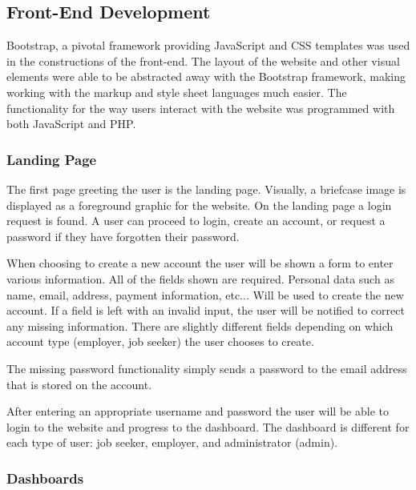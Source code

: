 \documentclass[11pt]{article}
\begin{document}
\subsection{Front-End Development}

Bootstrap, a pivotal framework providing JavaScript and CSS templates was used in the constructions of the front-end. The layout of the website and other visual elements were able to be abstracted away with the Bootstrap framework, making working with the markup and style sheet languages much easier. The functionality for the way users interact with the website was programmed with both JavaScript and PHP.

\subsubsection{Landing Page}

The first page greeting the user is the landing page. Visually, a briefcase image is displayed as a foreground graphic for the website. On the landing page a login request is found. A user can proceed to login, create an account, or request a password if they have forgotten their password. \par
When choosing to create a new account the user will be shown a form to enter various information. All of the fields shown are required. Personal data such as name, email, address, payment information, etc... Will be used to create the new account. If a field is left with an invalid input, the user will be notified to correct any missing information. There are slightly different fields depending on which account type (employer, job seeker) the user chooses to create. \par
The missing password functionality simply sends a password to the email address that is stored on the account. \par
After entering an appropriate username and password the user will be able to login to the website and progress to the dashboard. The dashboard is different for each type of user: job seeker, employer, and administrator (admin).

\subsubsection{Dashboards}
\end{document}
